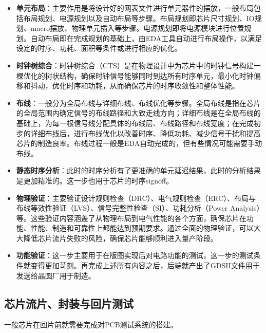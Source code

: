 \begin{itemize}
\tightlist
\item
  \textbf{单元布局}：主要作用是将设计好的网表文件进行单元器件的摆放，一般布局包括布局规划、电源规划以及自动布局等步骤。布局规划即芯片尺寸规划、IO规划、macro摆放、物理单元插入等步骤。电源规划即将电源模块进行位置规划。自动布局即在完成规划的基础上，由EDA工具自动进行布局操作，以满足设定的时序、功耗、面积等条件或进行相应的优化。
\item
  \textbf{时钟树综合}：时钟树综合（CTS）是在物理设计中为芯片中的时钟信号构建一棵优化的树状结构，确保时钟信号能够同时到达所有时序单元，最小化时钟偏移和抖动，优化时序和功耗，从而确保芯片的时序收敛性和整体性能。
\item
  \textbf{布线}：一般分为全局布线与详细布线、布线优化等步骤。全局布线是指在芯片的全局范围内确定信号的布线路径和大致走线方向；详细布线是在全局布线的基础上，为每一根信号线分配具体的布线层、布线路径和布线宽度；在完成初步的详细布线后，进行布线优化以改善时序、降低功耗、减少信号干扰和提高芯片的制造良率。布线过程一般是EDA自动完成的，但有些情况可能需要手动布线。
\item
  \textbf{静态时序分析}：此时的时序分析有了更准确的单元延迟结果，此时的分析结果是更加精准的。这一步也用于芯片的时序signoff。
\item
  \textbf{物理验证}：主要验证设计规则检查（DRC）、电气规则检查（ERC）、布局与布线等效性验证（LVS）、信号完整性检查（SI）、功耗分析（Power Analysis）等。这些验证内容涵盖了从物理布局到电气性能的各个方面，确保芯片在功能、性能、制造和可靠性上都能达到预期要求。通过全面的物理验证，可以大大降低芯片流片失败的风险，确保芯片能够顺利进入量产阶段。
\item
  \textbf{功能验证}：这一步主要用于在版图实现后对电路功能的测试，这一步的测试条件就变得更加苛刻。再完成上述所有内容之后，后端就产出了GDSII文件用于发送给晶圆厂用于制造。
\end{itemize}

\subsection{芯片流片、封装与回片测试}\label{sec:01-overview-009}

一般芯片在回片前就需要完成对PCB测试系统的搭建。

